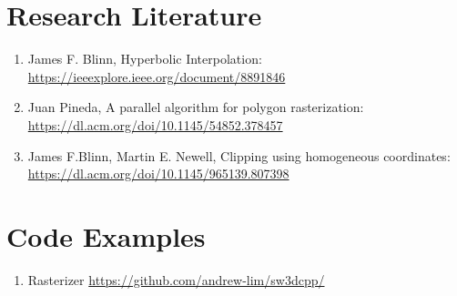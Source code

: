\section{Research Literature}
\begin{enumerate}
    \item James F. Blinn, Hyperbolic Interpolation: \url{https://ieeexplore.ieee.org/document/8891846}
     \item Juan Pineda, A parallel algorithm for polygon rasterization: \url{https://dl.acm.org/doi/10.1145/54852.378457}
      \item James F.Blinn, Martin E. Newell,  Clipping using homogeneous coordinates: \url{https://dl.acm.org/doi/10.1145/965139.807398}
\end{enumerate}

\section{Code Examples}
\begin{enumerate}
    \item Rasterizer \url{https://github.com/andrew-lim/sw3dcpp/}
\end{enumerate}
\clearpage